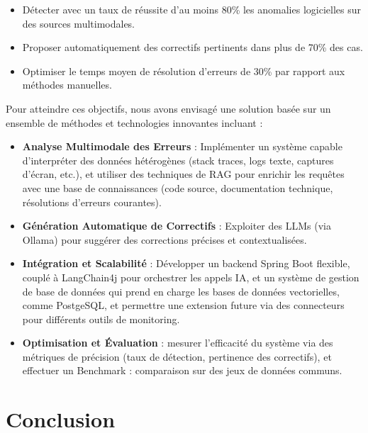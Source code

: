 \documentclass[12pt,a4paper]{report}
\begin{document}
	\renewcommand{\labelitemi}{$\bullet$}
	\begin{itemize}
		\item Détecter avec un taux de réussite d'au moins 80\% les anomalies logicielles sur des sources multimodales.
		
		\item Proposer automatiquement des correctifs pertinents dans plus de 70\% des cas.
		
		\item Optimiser le temps moyen de résolution d’erreurs de 30\% par rapport aux méthodes manuelles.
	\end{itemize}
	
	Pour atteindre ces objectifs, nous avons envisagé une solution basée sur un ensemble de méthodes et technologies innovantes incluant :
	
	\begin{itemize}
		\item \textbf{Analyse Multimodale des Erreurs} : Implémenter un système capable d’interpréter des données hétérogènes (stack traces, logs texte, captures d’écran, etc.), et utiliser des techniques de RAG pour enrichir les requêtes avec une base de connaissances (code source, documentation technique, résolutions d’erreurs courantes).
		
		\item \textbf{Génération Automatique de Correctifs} : Exploiter des LLMs (via Ollama) pour suggérer des corrections précises et contextualisées.
		
		\item \textbf{Intégration et Scalabilité} : Développer un backend Spring Boot flexible, couplé à LangChain4j pour orchestrer les appels IA, et un système de gestion de base de données qui prend en charge les bases de données vectorielles, comme PostgeSQL, et permettre une extension future via des connecteurs pour différents outils de monitoring.
		
		\item \textbf{Optimisation et Évaluation} : mesurer l’efficacité du système via des métriques de précision (taux de détection, pertinence des correctifs), et effectuer un Benchmark : comparaison sur des jeux de données communs.
		
	\end{itemize}
	
	\section{Conclusion}
	
\end{document}
